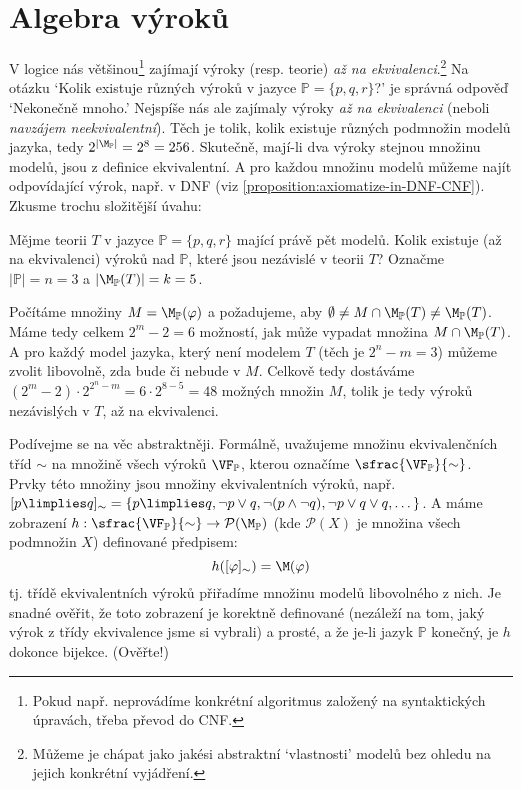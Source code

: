 \section{Algebra výroků}

V logice nás většinou\footnote{Pokud např. neprovádíme konkrétní algoritmus založený na syntaktických úpravách, třeba převod do CNF.} zajímají výroky (resp. teorie) \emph{až na ekvivalenci}.\footnote{Můžeme je chápat jako jakési abstraktní `vlastnosti' modelů bez ohledu na jejich konkrétní vyjádření.} Na otázku `Kolik existuje různých výroků v jazyce $\mathbb P=\{p,q,r\}$?' je správná odpověď `Nekonečně mnoho.' Nejspíše nás ale zajímaly výroky \emph{až na ekvivalenci} (neboli \emph{navzájem neekvivalentní}). Těch je tolik, kolik existuje různých podmnožin modelů jazyka, tedy $2^{|\M_\mathbb P|}=2^8=256$. Skutečně, mají-li dva výroky stejnou množinu modelů, jsou z definice ekvivalentní. A pro každou množinu modelů můžeme najít odpovídající výrok, např. v DNF (viz \ref{proposition:axiomatize-in-DNF-CNF}). Zkusme trochu složitější úvahu:

\begin{example}
    Mějme teorii $T$ v jazyce $\mathbb P=\{p,q,r\}$ mající právě pět modelů. Kolik existuje (až na ekvivalenci) výroků nad $\mathbb P$, které jsou nezávislé v teorii $T$? Označme $|\mathbb P|=n=3$ a $|\M_\mathbb P(T)|=k=5$.

    Počítáme množiny $M=\M_\mathbb P(\varphi)$ a požadujeme, aby $\emptyset\neq M\cap \M_\mathbb P(T)\neq\M_\mathbb P(T)$. Máme tedy celkem $2^m-2=6$ možností, jak může vypadat množina $M\cap \M_\mathbb P(T)$. A pro každý model jazyka, který není modelem $T$ (těch je $2^n-m=3$) můžeme zvolit libovolně, zda bude či nebude v $M$. Celkově tedy dostáváme $(2^m-2)\cdot2^{2^n-m}=6\cdot 2^{8-5}=48$ možných množin $M$, tolik je tedy výroků nezávislých v $T$, až na ekvivalenci.
\end{example}

Podívejme se na věc abstraktněji. Formálně, uvažujeme množinu ekvivalenčních tříd $\sim$ na množině všech výroků $\VF_\mathbb P$, kterou označíme $\sfrac{\VF_\mathbb P}{\sim}$. Prvky této množiny jsou množiny ekvivalentních výroků, např. $[p\limplies q]_\sim=\{p\limplies q,\neg p \lor q,\neg(p\land \neg q), \neg p\lor q\lor q,\dots\}$. A máme zobrazení $h:\sfrac{\VF_\mathbb P}{\sim}\to\mathcal P(\M_\mathbb P)$ (kde $\mathcal P(X)$ je množina všech podmnožin $X$) definované předpisem:
$$
h([\varphi]_\sim)=\M(\varphi)
$$
tj. třídě ekvivalentních výroků přiřadíme množinu modelů libovolného z nich. Je snadné ověřit, že toto zobrazení je korektně definované (nezáleží na tom, jaký výrok z třídy ekvivalence jsme si vybrali) a prosté, a že je-li jazyk $\mathbb P$ konečný, je $h$ dokonce bijekce. (Ověřte!)


